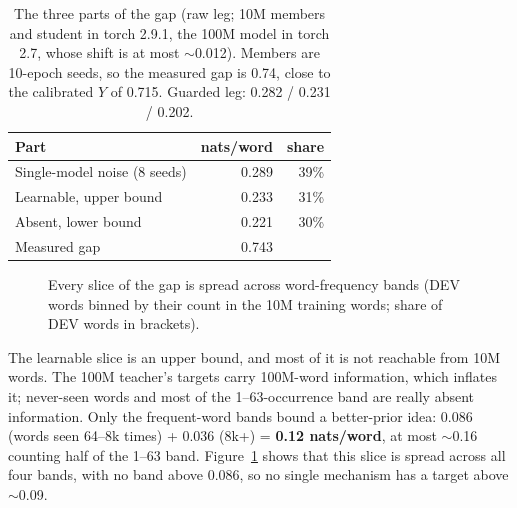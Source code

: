 \documentclass[11pt]{article}
\begin{document}
\begin{table}[t]
\centering
\small
\begin{tabular}{lrr}
\toprule
Part & nats/word & share \\
\midrule
Single-model noise (8 seeds) & 0.289 & 39\% \\
Learnable, upper bound & 0.233 & 31\% \\
Absent, lower bound & 0.221 & 30\% \\
\midrule
Measured gap & 0.743 & \\
\bottomrule
\end{tabular}
\caption{The three parts of the gap (raw leg; 10M members and student in torch 2.9.1, the 100M model in torch 2.7,
whose shift is at most $\sim$0.012). Members are 10-epoch seeds, so the measured gap
is 0.74, close to the calibrated $Y$ of 0.715. Guarded leg: 0.282 / 0.231 / 0.202.}
\label{tab:map}
\end{table}

\begin{figure}[t]
\centering
{}
\caption{Every slice of the gap is spread across word-frequency bands (DEV words binned by their count in the 10M
training words; share of DEV words in brackets).}
\label{fig:bands}
\end{figure}

The learnable slice is an upper bound, and most of it is not reachable from 10M words. The 100M teacher's targets carry
100M-word information, which inflates it; never-seen words and most of the 1--63-occurrence band are really absent
information. Only the frequent-word bands bound a better-prior idea: 0.086 (words seen 64--8k times) + 0.036 (8k+) =
\textbf{0.12 nats/word}, at most $\sim$0.16 counting half of the 1--63 band. Figure~\ref{fig:bands} shows that this
slice is spread across all four bands, with no band above 0.086, so no single mechanism has a target above $\sim$0.09.
\end{document}
